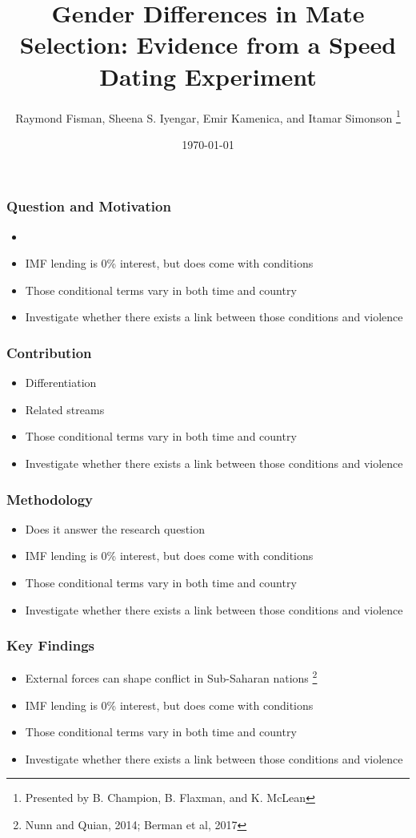 \documentclass{beamer}
\title{Gender Differences in Mate Selection: Evidence from a Speed Dating Experiment}
\author{Raymond Fisman, Sheena S. Iyengar, Emir Kamenica, and Itamar Simonson \thanks{Presented by B. Champion, B. Flaxman, and K. McLean}}
\date{\today}
\begin{document}
\maketitle

\begin{frame} \frametitle{Question and Motivation}
     \begin{itemize}
        \item  \pause
        \item IMF lending is 0\% interest, but does come with conditions \pause
        \item Those conditional terms vary in both time and country \pause
        \item Investigate whether there exists a link between those conditions and violence
    \end{itemize}
\end{frame}

\begin{frame} \frametitle{Contribution}
     \begin{itemize}
        \item Differentiation \pause
        \item Related streams \pause
        \item Those conditional terms vary in both time and country \pause
        \item Investigate whether there exists a link between those conditions and violence
    \end{itemize}
\end{frame}


\begin{frame} \frametitle{Methodology}
     \begin{itemize}
        \item Does it answer the research question \pause
        \item IMF lending is 0\% interest, but does come with conditions \pause
        \item Those conditional terms vary in both time and country \pause
        \item Investigate whether there exists a link between those conditions and violence
    \end{itemize}
\end{frame}

\begin{frame} \frametitle{Key Findings}
     \begin{itemize}
        \item External forces can shape conflict in Sub-Saharan nations \footnote{Nunn and Quian, 2014; Berman et al, 2017} \pause
        \item IMF lending is 0\% interest, but does come with conditions \pause
        \item Those conditional terms vary in both time and country \pause
        \item Investigate whether there exists a link between those conditions and violence
    \end{itemize}
\end{frame}
\end{document}
